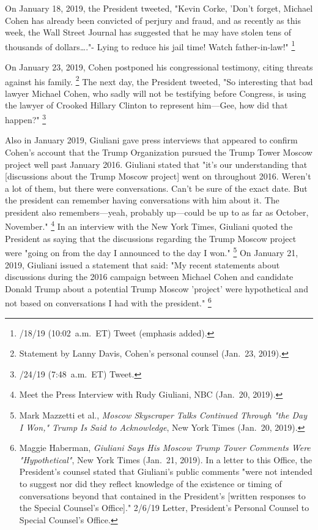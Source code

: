 {On January 18, 2019, the President tweeted, "Kevin Corke, \@FoxNews 'Don't forget, Michael Cohen has already been convicted of perjury and fraud, and as recently as this week, the Wall Street Journal has suggested that he may have stolen tens of thousands of dollars\dots."- Lying to reduce his jail time! Watch father-in-law!"%
\footnote{/18/19 (10:02~a.m.~ET) Tweet (emphasis added).}

On January 23, 2019, Cohen postponed his congressional testimony, citing threats against his family.%
\footnote{Statement by Lanny Davis, Cohen's personal counsel (Jan.~23, 2019).}
The next day, the President tweeted, "So interesting that bad lawyer Michael Cohen, who sadly will not be testifying before Congress, is using the lawyer of Crooked Hillary Clinton to represent him---Gee, how did that happen?"%
\footnote{/24/19 (7:48~a.m.~ET) Tweet.}

Also in January 2019, Giuliani gave press interviews that appeared to confirm Cohen's account that the Trump Organization pursued the Trump Tower Moscow project well past January 2016.
Giuliani stated that "it's our understanding that [discussions about the Trump Moscow project] went on throughout 2016.
Weren't a lot of them, but there were conversations.
Can't be sure of the exact date.
But the president can remember having conversations with him about it.
The president also remembers---yeah, probably up---could be up to as far as October, November."%
\footnote{Meet the Press Interview with Rudy Giuliani, NBC (Jan.~20, 2019).}
In an interview with the New York Times, Giuliani quoted the President as saying that the discussions regarding the Trump Moscow project were "going on from the day I announced to the day I won."%
\footnote{Mark Mazzetti et al., \textit{Moscow Skyscraper Talks Continued Through "the Day I Won," Trump Is Said to Acknowledge}, New York Times (Jan.~20, 2019).}
On January 21, 2019, Giuliani issued a statement that said: "My recent statements about discussions during the 2016 campaign between Michael Cohen and candidate Donald Trump about a potential Trump Moscow 'project' were hypothetical and not based on conversations I had with the president."%
\footnote{Maggie Haberman, \textit{Giuliani Says His Moscow Trump Tower Comments Were "Hypothetical"}, New York Times (Jan.~21, 2019).
In a letter to this Office, the President's counsel stated that Giuliani's public comments "were not intended to suggest nor did they reflect knowledge of the existence or timing of conversations beyond that contained in the President's [written responses to the Special Counsel's Office]."
2/6/19 Letter, President's Personal Counsel to Special Counsel's Office.}

}
